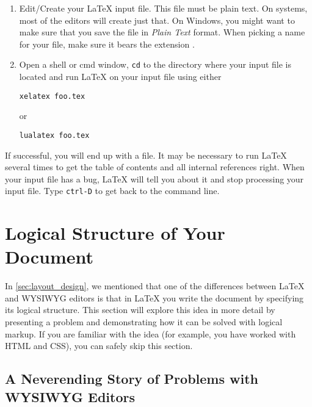 \begin{enumerate}
  \item Edit/Create your \LaTeX{} input file. This file must be plain text.  On
        \Unix{} systems, most of the editors will create just that. On Windows,
        you might want to make sure that you save the file in \emph{Plain Text}
        format. When picking a name for your file, make sure it bears the
        extension .

  \item Open a shell or cmd window, \texttt{cd} to the directory where your
        input file is located and run \LaTeX{} on your input file using either
        \begin{lscommand}
          \verb+xelatex foo.tex+
        \end{lscommand}
        or
        \begin{lscommand}
          \verb+lualatex foo.tex+
        \end{lscommand}
\end{enumerate}

If successful, you will end up with a  file. It may be necessary to
run \LaTeX{} several times to get the table of contents and all internal
references right. When your input file has a bug, \LaTeX{} will tell you about
it and stop processing your input file. Type \texttt{ctrl-D} to get back to the
command line.

\section{Logical Structure of Your Document}\label{sec:logical_structure}

In \autoref{sec:layout_design}, we mentioned that one of the
differences between \LaTeX{} and WYSIWYG editors is that in \LaTeX{} you write
the document by specifying its logical structure. This section will explore
this idea in more detail by presenting a problem and demonstrating how it can be
solved with logical markup. If you are familiar with the idea (for example, you
have worked with HTML and CSS), you can safely skip this section.

\subsection{A Neverending Story of Problems with WYSIWYG Editors}

